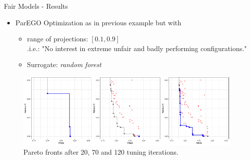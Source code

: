 \begin{frame}{Fair Models - Results}
\begin{itemize}
  \item ParEGO Optimization as in previous example but with
  \begin{itemize}
    \item range of projections: $[0.1, 0.9]$ \\
    .i.e.: "No interest in extreme unfair and badly performing configurations."
    \item Surrogate: \emph{random forest}
  \end{itemize}
\end{itemize}

\begin{figure}
\centering
\includegraphics{images/Pfisterer_et_al_2019_Multi_Objective_fig4.pdf}
\caption{Pareto fronts after 20, 70 and 120 tuning iterations.}
\end{figure}

    
\end{frame}





